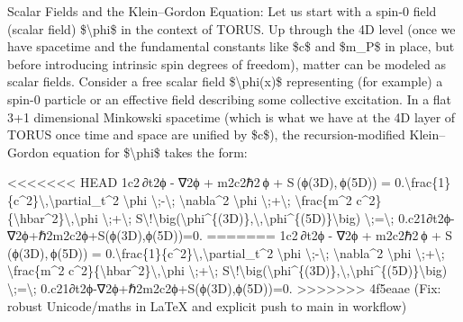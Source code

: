 \documentclass[]{article}
\begin{document}
Scalar Fields and the Klein--Gordon Equation: Let us start with a spin-0
field (scalar field) \$\textbackslash{}phi\$ in the context of TORUS. Up
through the 4D level (once we have spacetime and the fundamental
constants like \$c\$ and \$m\_P\$ in place, but before introducing
intrinsic spin degrees of freedom), matter can be modeled as scalar
fields. Consider a free scalar field \$\textbackslash{}phi(x)\$
representing (for example) a spin-0 particle or an effective field
describing some collective excitation. In a flat 3+1 dimensional
Minkowski spacetime (which is what we have at the 4D layer of TORUS once
time and space are unified by \$c\$), the recursion-modified
Klein--Gordon equation for \$\textbackslash{}phi\$ takes the form:

<<<<<<< HEAD
1c2 ∂t2ϕ  -  ∇2ϕ  +  m2c2ℏ2 ϕ  +  S ⁣(ϕ(3D), ϕ(5D))  =  0.\textbackslash frac\{1\}\{c\^{}2\}\textbackslash,\textbackslash partial\_t\^{}2
\textbackslash phi \textbackslash;-\textbackslash;
\textbackslash nabla\^{}2 \textbackslash phi
\textbackslash;+\textbackslash; \textbackslash frac\{m\^{}2
c\^{}2\}\{\textbackslash hbar\^{}2\}\textbackslash,\textbackslash phi
\textbackslash;+\textbackslash;
S\textbackslash!\textbackslash big(\textbackslash phi\^{}\{(3D)\},\textbackslash,\textbackslash phi\^{}\{(5D)\}\textbackslash big)
\textbackslash;=\textbackslash;
0.c21\hspace{0pt}∂t2\hspace{0pt}ϕ-∇2ϕ+ℏ2m2c2\hspace{0pt}ϕ+S(ϕ(3D),ϕ(5D))=0.
=======
1c2 ∂t2ϕ  -  ∇2ϕ  +  m2c2ℏ2 ϕ  +  S ⁣(ϕ(3D), ϕ(5D))  =  0.\textbackslash{}frac\{1\}\{c\^{}2\}\textbackslash{},\textbackslash{}partial\_t\^{}2
\textbackslash{}phi \textbackslash{};-\textbackslash{};
\textbackslash{}nabla\^{}2 \textbackslash{}phi
\textbackslash{};+\textbackslash{}; \textbackslash{}frac\{m\^{}2
c\^{}2\}\{\textbackslash{}hbar\^{}2\}\textbackslash{},\textbackslash{}phi
\textbackslash{};+\textbackslash{};
S\textbackslash{}!\textbackslash{}big(\textbackslash{}phi\^{}\{(3D)\},\textbackslash{},\textbackslash{}phi\^{}\{(5D)\}\textbackslash{}big)
\textbackslash{};=\textbackslash{};
0.c21​∂t2​ϕ-∇2ϕ+ℏ2m2c2​ϕ+S(ϕ(3D),ϕ(5D))=0.
>>>>>>> 4f5eaae (Fix: robust Unicode/maths in LaTeX and explicit push to main in workflow)
\end{document}
